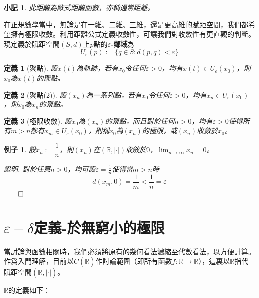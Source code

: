 \documentclass[12pt]{article}
\newtheorem{definition}{定義}
\newtheorem*{remark}{小記}
\newtheorem*{example}{例子}
\renewenvironment*{proof}{\textit{證明.}}{\hfill$\qed$}
\begin{document}
    \begin{remark}
        此距離為歐式距離函數，亦稱通常距離。
    \end{remark}

    在正規數學當中，無論是在一維、二維、三維，還是更高維的賦距空間，我們都希望擁有極限收斂。利用距離公式定義收斂性，可讓我們對收斂性有更直觀的判斷。現定義於賦距空間$(S,d)$上$p$點的\textbf{$\varepsilon$-鄰域}為$$U_\varepsilon(p):=\{q\in S:d(p,q)<\varepsilon\}$$

    \begin{definition}[聚點]
        設$x(t)$為軌跡，若有$x_0$令任何$\varepsilon>0$，均有$x(t)\in U_\varepsilon(x_0)$，則$x_0$為$x(t)$的聚點。
    \end{definition}

    \begin{definition}[聚點(2)]
        設$(x_n)$為一系列點，若有$x_0$令任何$\varepsilon>0$，均有$x_n\in U_\varepsilon(x_0)$，則$x_0$為$x_n$的聚點。
    \end{definition}

    \begin{definition}[極限收斂]
        設$x_0$為$(x_n)$的聚點，而且對於任何$n>0$，均有$\varepsilon>0$使得所有$m> n$都有$x_m\in U_\varepsilon(x_0)$，則稱$x_0$為$(x_n)$的極限，或$(x_n)$收斂於$x_0$。
    \end{definition}

    \begin{example}
        設$x_n:=\dfrac{1}{n}$，則$(x_n)$在$(\mathbb{R},|\cdot|)$收斂於$0$，$\lim_{n\to \infty}x_n=0$。

        \begin{proof}
            對於任意$n>0$，均可設$\varepsilon=\frac{1}{n}$使得當$m> n$時$$d(x_m,0)=\frac{1}{m}<\frac{1}{n}=\varepsilon$$
        \end{proof}
    \end{example}

    \section*{$\varepsilon-\delta$定義-於無窮小的極限}

    當討論與函數相關時，我們必須將原有的幾何看法濃縮至代數看法，以方便計算。作爲入門理解，目前以$C(\overline{\mathbb{R}})$作討論範圍（即所有函數$f:\overline{\mathbb{R}}\to\overline{\mathbb{R}}$），這裏以$\overline{\mathbb{R}}$指代賦距空間$(\overline{\mathbb{R}},|\cdot|)$。

    $\overline{\mathbb{R}}$的定義如下：
\end{document}
